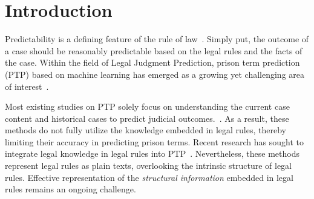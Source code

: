 \section{Introduction} \label{int}
Predictability is a defining feature of the rule of law~\cite{frost2015predictability}. Simply put, the outcome of a case should be reasonably predictable based on the legal rules and the facts of the case. Within the field of Legal Judgment Prediction, prison term prediction (PTP) based on machine learning has emerged as a growing yet challenging area of interest~\cite{kim-2014-convolutional,DBLP:conf/ijcai/FengL022,DBLP:journals/access/CuiSW23,zhong-etal-2020-nlp}.

Most existing studies on PTP solely focus on understanding the current case content and historical cases to predict judicial outcomes.~\cite{devlin-etal-2019-bert,DBLP:conf/iclr/ClarkLLM20,Rformer,DBLP:conf/cicai/ZhouLWKZW22}. 
As a result, these methods do not fully utilize the knowledge embedded in legal rules, thereby limiting their accuracy in predicting prison terms.
Recent research has sought to integrate legal knowledge in legal rules into PTP~\cite{neurjudge,ML-LJP}. Nevertheless, these methods represent legal rules as plain texts, overlooking the intrinsic structure of legal rules.
Effective representation of the \emph{structural information} embedded in legal rules remains an ongoing challenge.

